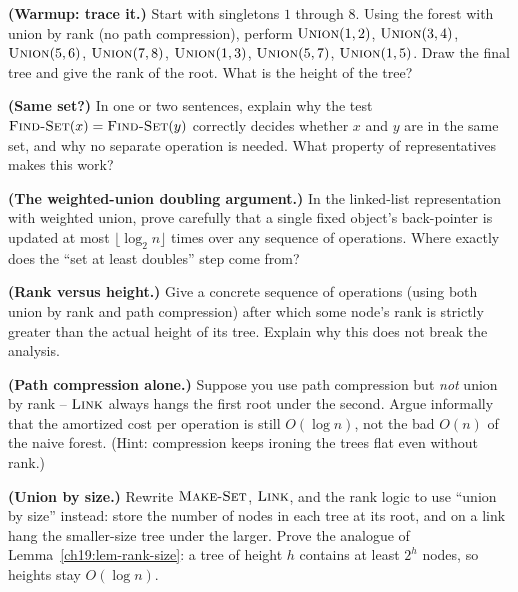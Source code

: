 \begin{exercise}
\textbf{(Warmup: trace it.)} Start with singletons $1$ through $8$. Using the
forest with union by rank (no path compression), perform $\textsc{Union}(1,2)$,
$\textsc{Union}(3,4)$, $\textsc{Union}(5,6)$, $\textsc{Union}(7,8)$,
$\textsc{Union}(1,3)$, $\textsc{Union}(5,7)$, $\textsc{Union}(1,5)$. Draw the
final tree and give the rank of the root. What is the height of the tree?
\end{exercise}

\begin{exercise}
\textbf{(Same set?)} In one or two sentences, explain why the test
$\textsc{Find-Set}(x) = \textsc{Find-Set}(y)$ correctly decides whether $x$ and
$y$ are in the same set, and why no separate operation is needed. What property
of representatives makes this work?
\end{exercise}

\begin{exercise}
\textbf{(The weighted-union doubling argument.)} In the linked-list
representation with weighted union, prove carefully that a single fixed object's
back-pointer is updated at most $\lfloor \log_2 n \rfloor$ times over any
sequence of operations. Where exactly does the ``set at least doubles'' step
come from?
\end{exercise}

\begin{exercise}
\textbf{(Rank versus height.)} Give a concrete sequence of operations (using
both union by rank and path compression) after which some node's rank is
strictly greater than the actual height of its tree. Explain why this does not
break the analysis.
\end{exercise}

\begin{exercise}
\textbf{(Path compression alone.)} Suppose you use path compression but
\emph{not} union by rank -- $\textsc{Link}$ always hangs the first root under
the second. Argue informally that the amortized cost per operation is still
$O(\log n)$, not the bad $O(n)$ of the naive forest. (Hint: compression keeps
ironing the trees flat even without rank.)
\end{exercise}

\begin{exercise}
\textbf{(Union by size.)} Rewrite $\textsc{Make-Set}$, $\textsc{Link}$, and the
rank logic to use ``union by size'' instead: store the number of nodes in each
tree at its root, and on a link hang the smaller-size tree under the larger.
Prove the analogue of Lemma~\ref{ch19:lem-rank-size}: a tree of height $h$
contains at least $2^h$ nodes, so heights stay $O(\log n)$.
\end{exercise}

